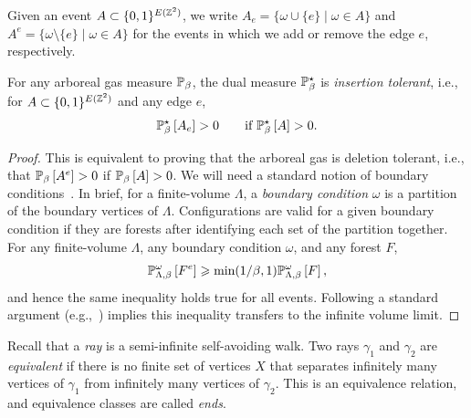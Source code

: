 \documentclass[11pt]{amsart}
\numberwithin{equation}{section}
\numberwithin{theorem}{section}
\newcommand{\cb}[1]{\left[#1\right ]} %
\begin{document}
Given an event $A\subset \{0,1\}^{E(\Z^{2})}$, we write $A_{e} = \{
\omega\cup \{e\} \mid \omega \in A\}$ and $A^{e} = \{ \omega\setminus
\{e\} \mid \omega \in A\}$ for the events in which we add or remove
the edge $e$, respectively. 
\begin{lemma}
  \label{lem:insert-tolerant}
  For any arboreal gas measure $\P_{\beta}$, the dual measure
  $\P_{\beta}^{\star}$ is \emph{insertion tolerant}, i.e., for $A\subset
  \{0,1\}^{E(\Z^{2})}$ and any edge $e$,
  \begin{equation}
    \label{eq:IT}
    \P_{\beta}^{\star}\cb{A_{e}} > 0 \qquad \text{if  $\P_{\beta}^{\star}\cb{A}>0$}.
  \end{equation}
\end{lemma}
\begin{proof}
  This is equivalent to proving that the arboreal gas is deletion
  tolerant, i.e., that $\P_{\beta}\cb{A^{e}}>0$ if
  $\P_{\beta}\cb{A}>0$. We will need a standard notion of boundary
  conditions~\cite[Section~1.2.1]{MR4043224}. In brief, for a
  finite-volume $\Lambda$, a \emph{boundary condition} $\omega$ is a
  partition of the boundary vertices of $\Lambda$. Configurations are
  valid for a given boundary condition if they are forests after
  identifying each set of the partition together.
%
  For any finite-volume $\Lambda$, any boundary condition $\omega$,
  and any forest $F$,
  \begin{equation*}
    \P_{\Lambda,\beta}^{\omega}\cb{F^{e}}\geq \text{min}(1/\beta,1)  
    \P_{\Lambda,\beta}^{\omega}\cb{F},
  \end{equation*}
  and hence the same inequality holds true for all events. Following a
  standard argument (e.g.,~\cite[Theorem~4.17 (b)]{MR2243761}) implies
  this inequality transfers to the infinite volume limit.
\end{proof}

Recall that a \emph{ray} is a semi-infinite self-avoiding walk. Two
rays $\gamma_{1}$ and $\gamma_{2}$ are \emph{equivalent} if there is
no finite set of vertices $X$ that separates infinitely many vertices
of $\gamma_{1}$ from infinitely many vertices of $\gamma_{2}$. This is
an equivalence relation, and equivalence classes are called
\emph{ends}. 
\end{document}
